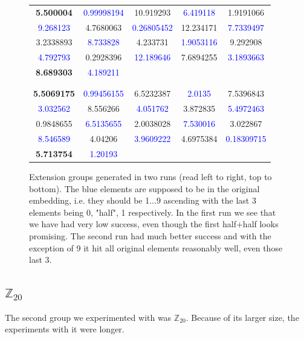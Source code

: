 \begin{figure}[h]
\centering
\caption{Extension groups generated in two runs (read left to right, top to bottom). The blue elements are supposed to be in the original embedding, i.e. they should be 1...9 ascending with the last 3 elements being 0, "half", 1 respectively. In the first run we see that we have had very low success, even though the first half+half looks promising. The second run had much better success and with the exception of 9 it hit all original elements reasonably well, even those last 3.}
\label{table:z10_half_generator}
\begin{tabular}{ccccc}
\textbf{5.500004} & \textcolor{blue}{0.99998194} & 10.919293 & \textcolor{blue}{6.419118} & 1.9191066\\
 \textcolor{blue}{9.268123} & 4.7680063 & \textcolor{blue}{0.26805452} & 12.234171 & \textcolor{blue}{7.7339497}\\
3.2338893 & \textcolor{blue}{8.733828} & 4.233731 & \textcolor{blue}{1.9053116} & 9.292908 \\
\textcolor{blue}{4.792793} & 0.2928396 & \textcolor{blue}{12.189646} & 7.6894255 & \textcolor{blue}{3.1893663}\\
\textbf{8.689303} & \textcolor{blue}{4.189211}\\
 \\
\hline\\

\textbf{5.5069175} & \textcolor{blue}{0.99456155} & 6.5232387 & \textcolor{blue}{2.0135} & 7.5396843\\
\textcolor{blue}{3.032562} & 8.556266 & \textcolor{blue}{4.051762} & 3.872835 & \textcolor{blue}{5.4972463}\\
0.9848655 & \textcolor{blue}{6.5135655} & 2.0038028 & \textcolor{blue}{7.530016} & 3.022867\\
\textcolor{blue}{8.546589} & 4.04206 & \textcolor{blue}{3.9609222} & 4.6975384 & \textcolor{blue}{0.18309715}\\
\textbf{5.713754} & \textcolor{blue}{1.20193}
\end{tabular}

\end{figure}


\subsection{$\mathbb{Z}_{20}$}
The second group we experimented with was $\mathbb{Z}_{20}$. Because of its larger size, the experiments with it were longer. 

